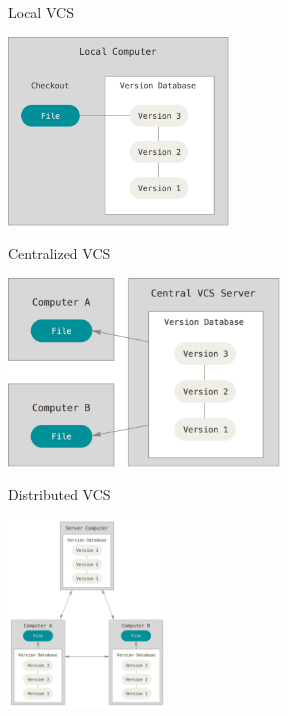 \documentclass{beamer}
\begin{document}
\begin{frame}{Local VCS}
\begin{center}
\includegraphics[height=5cm,keepaspectratio]{local}
\end{center}
\end{frame}

\begin{frame}{Centralized VCS}
\begin{center}
\includegraphics[height=5cm,keepaspectratio]{centralized}
\end{center}
\end{frame}

\begin{frame}{Distributed VCS}
\begin{center}
\includegraphics[height=5cm,keepaspectratio]{distributed}
\end{center}
\end{frame}
\end{document}
